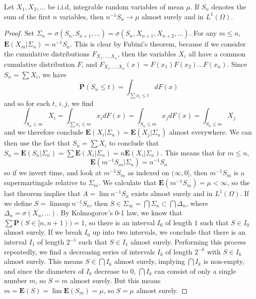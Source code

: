 \begin{corollary}
    Let $X_1, X_2, \dots$ be i.i.d, integrable random variables of mean $\mu$. If $S_n$ denotes the sum of the first $n$ variables, then $n^{-1}S_n \to \mu$ almost surely and in $L^1(\Omega)$.
\end{corollary}
\begin{proof}
    Set $\Sigma_n = \sigma(S_n,S_{n+1}, \dots) = \sigma(S_n, X_{n+1}, X_{n+2}, \dots)$. For any $m \leq n$, $\mathbf{E}(X_m|\Sigma_n) = n^{-1}S_n$. This is clear by Fubini's theorem, because if we consider the cumulative distributions $F_{X_1, \dots, X_n}$, then the variables $X_i$ all have a common cumulative distribution $F$, and $F_{X_1, \dots, X_n}(x) = F(x_1) F(x_2) \dots F(x_n)$. Since $S_n = \sum X_i$, we have
    \[ \mathbf{P}(S_n \leq t) = \int_{\sum x_i \leq t} dF(x) \]
    and so for each $t$, $i,j$, we find
    \[ \int_{S_n \leq m} X_i = \int_{\sum x_i \leq m} x_i dF(x) = \int_{S_n \leq m} x_j dF(x) = \int_{S_n \leq m} X_j \]
    and we therefore conclude $\mathbf{E}(X_i|\Sigma_n) = \mathbf{E}(X_j|\Sigma_{n})$ almost everywhere. We can then use the fact that $S_n = \sum X_i$ to conclude that $S_n = \mathbf{E}(S_n|\Sigma_{n}) = \sum \mathbf{E}(X_i|\Sigma_{n}) = n\mathbf{E}(X_i|\Sigma_{n})$. This means that for $m \leq n$,
    \[ \mathbf{E}(m^{-1}S_m|\Sigma_n) = n^{-1}S_n \]
    so if we invert time, and look at $m^{-1}S_m$ as indexed on $(\infty,0]$, then $m^{-1}S_m$ is a supermartingale relative to $\Sigma_m$. We calculate that $\mathbf{E}(m^{-1}S_m) = \mu < \infty$, so the last theorem implies that $A = \lim n^{-1}S_n$ exists almost surely and in $L^1(\Omega)$. If we define $S = \limsup n^{-1}S_n$, then $S \in \Sigma_\infty = \bigcap \Sigma_n \subset \bigcap \Delta_n$, where $\Delta_n = \sigma(X_n, \dots)$. By Kolmogorov's 0-1 law, we know that $\sum \mathbf{P}(S \in [n,n+1)) = 1$, so there is an interval $I_0$ of length $1$ such that $S \in I_0$ almost surely. If we break $I_0$ up into two intervals, we conclude that there is an interval $I_1$ of length $2^{-1}$ such that $S \in I_1$ almost surely. Performing this process repeatedly, we find a decreasing series of intervals $I_k$ of length $2^{-k}$ with $S \in I_k$ almost surely. This means $S \in \bigcap I_k$ almost surely, implying $\bigcap I_k$ is non-empty, and since the diameters of $I_k$ decrease to $0$, $\bigcap I_k$ can consist of only a single number $m$, so $S = m$ almost surely. But this means $m = \mathbf{E}(S) = \lim \mathbf{E}(S_m) = \mu$, so $S = \mu$ almost surely.
\end{proof}

